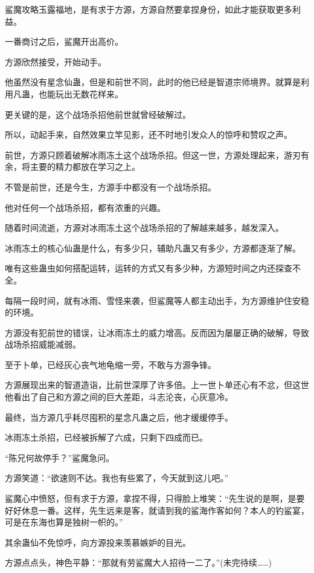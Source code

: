 \begin{this_body}
鲨魔攻略玉露福地，是有求于方源，方源自然要拿捏身份，如此才能获取更多利益。

一番商讨之后，鲨魔开出高价。

方源欣然接受，开始动手。

他虽然没有星念仙蛊，但是和前世不同，此时的他已经是智道宗师境界。就算是利用凡蛊，也能玩出无数花样来。

更关键的是，这个战场杀招他前世就曾经破解过。

所以，动起手来，自然效果立竿见影，还不时地引发众人的惊呼和赞叹之声。

前世，方源只顾着破解冰雨冻土这个战场杀招。但这一世，方源处理起来，游刃有余，将主要的精力都放在学习之上。

不管是前世，还是今生，方源手中都没有一个战场杀招。

他对任何一个战场杀招，都有浓重的兴趣。

随着时间流逝，方源对冰雨冻土这个战场杀招的了解越来越多，越发深入。

冰雨冻土的核心仙蛊是什么，有多少只，辅助凡蛊又有多少，方源都逐渐了解。

唯有这些蛊虫如何搭配运转，运转的方式又有多少种，方源短时间之内还探查不全。

每隔一段时间，就有冰雨、雪怪来袭，但鲨魔等人都主动出手，为方源维护住安稳的环境。

方源没有犯前世的错误，让冰雨冻土的威力增高。反而因为屡屡正确的破解，导致战场杀招威能减弱。

至于卜单，已经灰心丧气地龟缩一旁，不敢与方源争锋。

方源展现出来的智道造诣，比前世深厚了许多倍。上一世卜单还心有不忿，但这世他看出了自己和方源之间的巨大差距，斗志沦丧，心灰意冷。

最终，当方源几乎耗尽囤积的星念凡蛊之后，他才缓缓停手。

冰雨冻土杀招，已经被拆解了六成，只剩下四成而已。

“陈兄何故停手？”鲨魔急问。

方源笑道：“欲速则不达。我也有些累了，今天就到这儿吧。”

鲨魔心中愤怒，但有求于方源，拿捏不得，只得脸上堆笑：“先生说的是啊，是要好好休息一番。这样，先生远来是客，就请到我的鲨海作客如何？本人的钓鲨宴，可是在东海也算是独树一帜的。”

其余蛊仙不免惊呼，向方源投来羡慕嫉妒的目光。

方源点点头，神色平静：“那就有劳鲨魔大人招待一二了。”(未完待续……)

\end{this_body}

